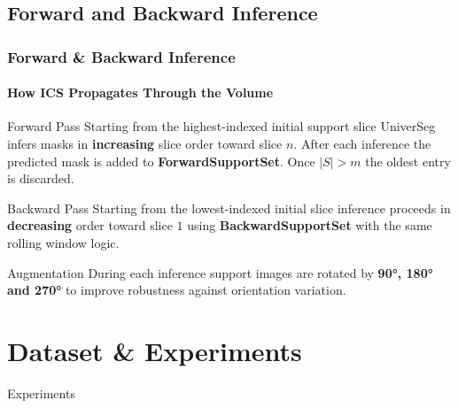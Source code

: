 \documentclass[nometaot,lecture,amberg,toc=twocolumn,indicatelastpageofframe,footlinebox]{OTHAWbeamer}
\begin{document}
\subsection{Forward and Backward Inference}
\begin{frame}[label=method6]
    \frametitle{Forward \& Backward Inference}
    \framesubtitle{How ICS Propagates Through the Volume}

    \begin{block}{Forward Pass}
        Starting from the highest-indexed initial support slice
        UniverSeg infers masks in \textcolor{orange1}{\textbf{increasing}}
        slice order toward slice $n$. After each inference the predicted
        mask is added to \textbf{ForwardSupportSet}. Once $|S| > m$
        the oldest entry is discarded.
    \end{block}

    \vspace{0.5em}

    \begin{block}{Backward Pass}
        Starting from the lowest-indexed initial slice inference proceeds
        in \textcolor{orange1}{\textbf{decreasing}} order toward slice $1$
        using \textbf{BackwardSupportSet} with the same rolling window logic.
    \end{block}

    \vspace{0.5em}

    \begin{exampleblock}{Augmentation}
        During each inference support images are rotated by
        \textbf{90°, 180° and 270°} to improve robustness
        against orientation variation.
    \end{exampleblock}

\end{frame}


\section{Dataset \& Experiments}
\begin{breakframe}
    Experiments
\end{breakframe}

\end{document}

